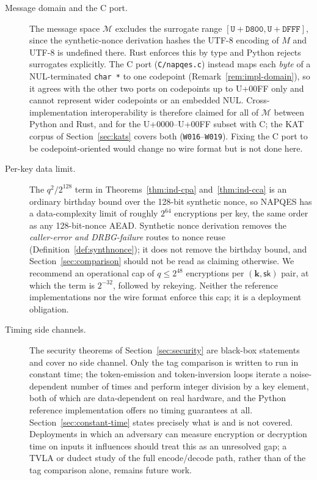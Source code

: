 \documentclass[11pt,a4paper]{article}
\begin{document}
\begin{description}
  \item[Message domain and the C port.] The message space $\mathcal{M}$
        excludes the surrogate range $[\mathtt{U+D800},\mathtt{U+DFFF}]$,
        since the synthetic-nonce derivation hashes the UTF-8 encoding of
        $M$ and UTF-8 is undefined there. Rust enforces this by type and
        Python rejects surrogates explicitly. The C port
        (\texttt{C/napqes.c}) instead maps each \emph{byte} of a
        NUL-terminated \texttt{char\,*} to one codepoint
        (Remark~\ref{rem:impl-domain}), so it agrees with the other two
        ports on codepoints up to U+00FF only and cannot represent wider
        codepoints or an embedded NUL. Cross-implementation interoperability
        is therefore claimed for all of $\mathcal{M}$ between Python and
        Rust, and for the U+0000--U+00FF subset with C; the KAT corpus of
        Section~\ref{sec:kats} covers both (\texttt{W016}--\texttt{W019}).
        Fixing the C port to be
        codepoint-oriented would change no wire format but is not done here.

  \item[Per-key data limit.] The $q^2/2^{128}$ term in
        Theorems~\ref{thm:ind-cpa} and~\ref{thm:ind-cca} is an ordinary
        birthday bound over the 128-bit synthetic nonce, so NAPQES has a
        data-complexity limit of roughly $2^{64}$ encryptions per key, the
        same order as any 128-bit-nonce AEAD. Synthetic nonce derivation
        removes the \emph{caller-error and DRBG-failure} routes to nonce
        reuse (Definition~\ref{def:synthnonce}); it does not remove the
        birthday bound, and Section~\ref{sec:comparison} should not be read
        as claiming otherwise. We recommend an operational cap of
        $q\le2^{48}$ encryptions per $(\mathbf{k},\mathsf{sk})$ pair, at
        which the term is $2^{-32}$, followed by rekeying. Neither the
        reference implementations nor the wire format enforce this cap;
        it is a deployment obligation.

  \item[Timing side channels.] The security theorems of
        Section~\ref{sec:security} are black-box statements and cover no
        side channel. Only the tag comparison is written to run in constant
        time; the token-emission and token-inversion loops iterate a
        noise-dependent number of times and perform integer division by a
        key element, both of which are data-dependent on real hardware, and
        the Python reference implementation offers no timing guarantees at
        all. Section~\ref{sec:constant-time} states precisely what is and is
        not covered. Deployments in which an adversary can measure
        encryption or decryption time on inputs it influences should treat
        this as an unresolved gap; a TVLA or dudect study of the full
        encode/decode path, rather than of the tag comparison alone, remains
        future work.
\end{description}
\end{document}
